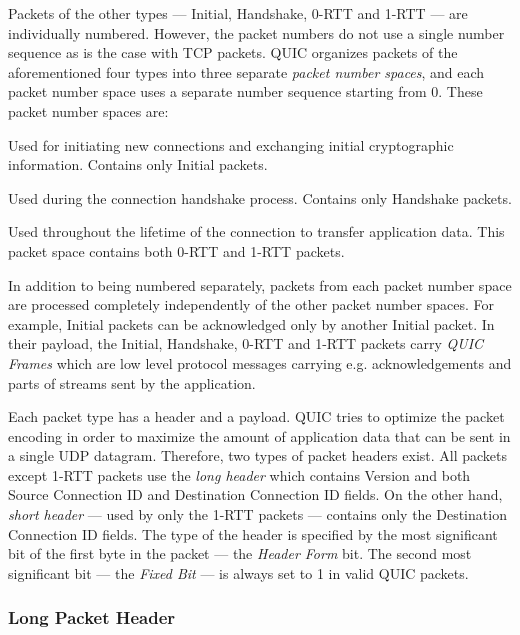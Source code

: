 Packets of the other types --- Initial, Handshake, 0-RTT and 1-RTT --- are individually numbered.
However, the packet numbers do not use a single number sequence as is the case with TCP packets.
QUIC organizes packets of the aforementioned four types into three separate \textit{packet number
  spaces}, and each packet number space uses a separate number sequence starting from 0. These
packet number spaces are:

\begin{enumerate}

   Used for initiating new connections and exchanging initial cryptographic
  information. Contains only Initial packets.

   Used during the connection handshake process. Contains only Handshake packets.

   Used throughout the lifetime of the connection to transfer application data.
  This packet space contains both 0-RTT and 1-RTT packets.

\end{enumerate}

In addition to being numbered separately, packets from each packet number space are processed
completely independently of the other packet number spaces. For example, Initial packets can be
acknowledged only by another Initial packet. In their payload, the Initial, Handshake, 0-RTT and
1-RTT packets carry \textit{QUIC Frames} which are low level protocol messages carrying e.g.
acknowledgements and parts of streams sent by the application.

Each packet type has a header and a payload. QUIC tries to optimize the packet encoding in order to
maximize the amount of application data that can be sent in a single UDP datagram. Therefore, two
types of packet headers exist. All packets except 1-RTT packets use the \textit{long header} which
contains Version and both Source Connection ID and Destination Connection ID fields. On the other
hand, \textit{short header} --- used by only the 1-RTT packets --- contains only the Destination
Connection ID fields. The type of the header is specified by the most significant bit of the first
byte in the packet --- the \textit{Header Form} bit. The second most significant bit --- the
\textit{Fixed Bit} --- is always set to 1 in valid QUIC packets.

\newcommand{\longFieldHeight}{1}

\subsubsection{Long Packet Header}

